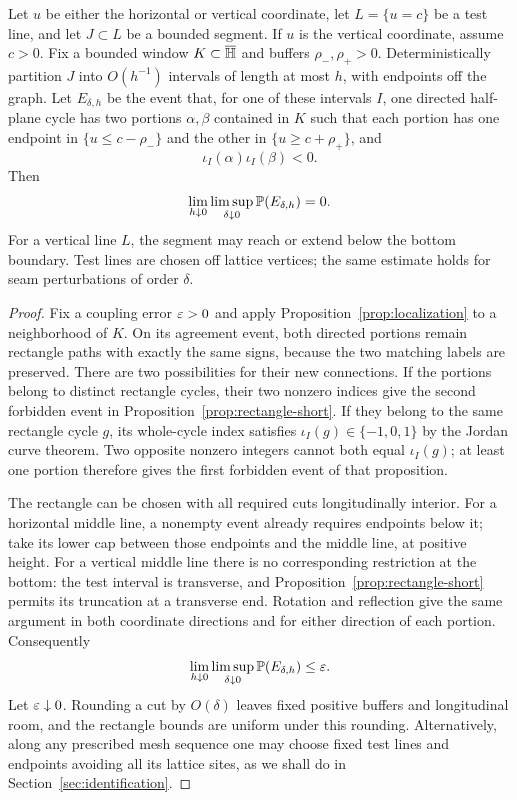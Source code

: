 \begin{proposition}
\label{prop:local-opposite}
Let $u$ be either the horizontal or vertical coordinate, let
$L=\{u=c\}$ be a test line, and let $J\subset L$ be a bounded segment.
If $u$ is the vertical coordinate, assume $c>0$.  Fix a bounded window
$K\subset\overline{\mathbb H}$ and buffers $\rho_-,\rho_+>0$.  Deterministically partition $J$
into $O(h^{-1})$ intervals of length at most $h$, with endpoints off the
graph.  Let $E_{\delta,h}$ be the event that, for one of these intervals
$I$, one directed half-plane cycle has two portions $\alpha,\beta$
contained in $K$ such that each portion has one endpoint in
$\{u\le c-\rho_-\}$ and the other in $\{u\ge c+\rho_+\}$, and
\[
 \iota_I(\alpha)\iota_I(\beta)<0.
\]
Then
\begin{equation}
 \lim_{h\downarrow0}\limsup_{\delta\downarrow0}
 \mathbb P(E_{\delta,h})=0.
 \label{eq:local-opposite-limit}
\end{equation}
For a vertical line $L$, the segment may reach or extend below the
bottom boundary.  Test lines are chosen off lattice vertices; the
same estimate holds for seam perturbations of order $\delta$.
\end{proposition}

\begin{proof}
Fix a coupling error $\varepsilon>0$ and apply
Proposition~\ref{prop:localization} to a neighborhood of $K$.
On its agreement event, both directed portions remain rectangle
paths with exactly the same signs, because the two matching labels
are preserved.  There are two possibilities for their new connections.
If the portions belong to distinct rectangle cycles, their two nonzero
indices give the second forbidden event in
Proposition~\ref{prop:rectangle-short}.  If they belong to the same
rectangle cycle $g$, its whole-cycle index satisfies
$\iota_I(g)\in\{-1,0,1\}$ by the Jordan curve theorem.  Two opposite nonzero
integers cannot both equal $\iota_I(g)$; at least one portion therefore
gives the first forbidden event of that proposition.

The rectangle can be chosen with all required cuts longitudinally
interior.  For a horizontal middle line, a nonempty event already
requires endpoints below it; take its lower cap between those
endpoints and the middle line, at positive height.  For a vertical
middle line there is no corresponding restriction at the bottom:
the test interval is transverse, and
Proposition~\ref{prop:rectangle-short} permits its truncation at a
transverse end.  Rotation and reflection give the same argument in
both coordinate directions and for either direction of each portion.
Consequently
\[
 \lim_{h\downarrow0}\limsup_{\delta\downarrow0}
 \mathbb P(E_{\delta,h})\le\varepsilon.
\]
Let $\varepsilon\downarrow0$.  Rounding a cut by $O(\delta)$ leaves fixed
positive buffers and longitudinal room, and the rectangle bounds are
uniform under this rounding.  Alternatively, along any prescribed
mesh sequence one may choose fixed test lines and endpoints avoiding
all its lattice sites, as we shall do in Section~\ref{sec:identification}.
\end{proof}


